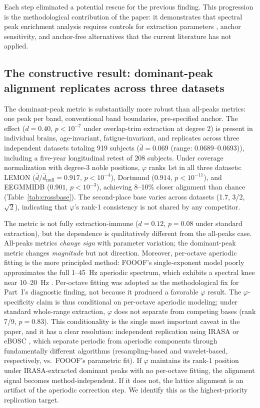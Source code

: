 \documentclass[11pt,a4paper]{article}
\newcommand{\phisym}{\varphi}
\begin{document}
Each step eliminated a potential rescue for the previous finding. This progression is the methodological contribution of the paper: it demonstrates that spectral peak enrichment analysis requires controls for extraction parameters \parencite{Donoghue2022methods, Ostlund2022}, anchor sensitivity, and anchor-free alternatives that the current literature has not applied.

\subsection{The constructive result: dominant-peak alignment replicates across three datasets}

The dominant-peak metric is substantially more robust than all-peaks metrics: one peak per band, conventional band boundaries, pre-specified anchor. The effect ($d = 0.40$, $p < 10^{-7}$ under overlap-trim extraction at degree 2) is present in individual brains, age-invariant, fatigue-invariant, and replicates across three independent datasets totaling 919 subjects ($\bar{d} = 0.069$ (range: 0.0689--0.0693)), including a five-year longitudinal retest of 208 subjects. Under coverage normalization with degree-3 noble positions, $\phisym$ ranks 1st in all three datasets: LEMON ($\bar{d}/\bar{d}_{\text{null}} = 0.917$, $p < 10^{-4}$), Dortmund ($0.914$, $p < 10^{-11}$), and EEGMMIDB ($0.901$, $p < 10^{-3}$), achieving 8--10\% closer alignment than chance (Table~\ref{tab:crossbase}). The second-place base varies across datasets (1.7, 3/2, $\sqrt{2}$), indicating that $\phisym$'s rank-1 consistency is not shared by any competitor.

The metric is not fully extraction-immune ($d = 0.12$, $p = 0.08$ under standard extraction), but the dependence is qualitatively different from the all-peaks case. All-peaks metrics \textit{change sign} with parameter variation; the dominant-peak metric changes \textit{magnitude} but not direction. Moreover, per-octave aperiodic fitting is the more principled method: FOOOF's single-exponent model poorly approximates the full 1--45~Hz aperiodic spectrum, which exhibits a spectral knee near 10--20~Hz \parencite{Donoghue2020, Gao2017}. Per-octave fitting was adopted as the methodological fix for Part~I's diagnostic finding, not because it produced a favorable $\phisym$ result. The $\phisym$-specificity claim is thus conditional on per-octave aperiodic modeling; under standard whole-range extraction, $\phisym$ does not separate from competing bases (rank 7/9, $p = 0.83$). This conditionality is the single most important caveat in the paper, and it has a clear resolution: independent replication using IRASA \parencite{Wen2016} or eBOSC \parencite{Kosciessa2020}, which separate periodic from aperiodic components through fundamentally different algorithms (resampling-based and wavelet-based, respectively, vs.\ FOOOF's parametric fit). If $\phisym$ maintains its rank-1 position under IRASA-extracted dominant peaks with no per-octave fitting, the alignment signal becomes method-independent. If it does not, the lattice alignment is an artifact of the aperiodic correction step. We identify this as the highest-priority replication target.
\end{document}

